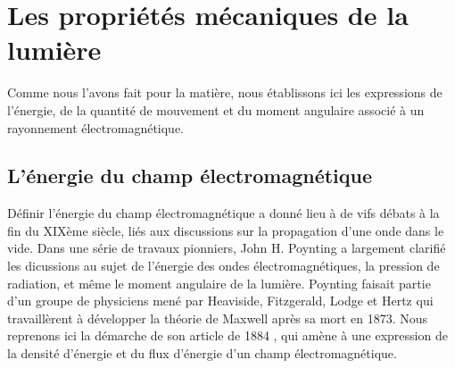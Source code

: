 \section{Les propriétés mécaniques de la lumière}
Comme nous l'avons fait pour la matière, nous établissons ici les expressions de l'énergie, de la quantité de mouvement et du moment angulaire associé à un rayonnement électromagnétique.

\subsection{L'énergie du champ électromagnétique} 
Définir l'énergie du champ électromagnétique a donné lieu à de vifs débats à la fin du XIXème siècle, liés aux discussions sur la propagation d'une onde dans le vide. Dans une série de travaux pionniers, John H. Poynting a largement clarifié les dicussions au sujet de l'énergie des ondes électromagnétiques, la pression de radiation, et même le moment angulaire de la lumière. Poynting faisait partie d'un groupe de physiciens mené par Heaviside, Fitzgerald, Lodge et Hertz qui travaillèrent à développer la théorie de Maxwell après sa mort en 1873. Nous reprenons ici la démarche de son article de 1884 , qui amène à une expression de la densité d'énergie et du flux d'énergie d'un champ électromagnétique.

